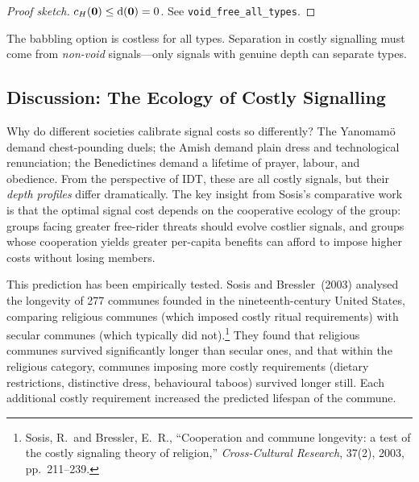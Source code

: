 \begin{proof}[Proof sketch]
$c_H(\mathbf{0}) \leq \operatorname{d}(\mathbf{0}) = 0$.
See \texttt{void\_free\_all\_types}.
\end{proof}

\begin{remark}
The babbling option is costless for all types.  Separation in costly
signalling must come from \emph{non-void} signals---only signals with
genuine depth can separate types.
\end{remark}

\subsection*{Discussion: The Ecology of Costly Signalling}

Why do different societies calibrate signal costs so differently?  The
Yanomam\"{o} demand chest-pounding duels; the Amish demand plain dress
and technological renunciation; the Benedictines demand a lifetime of
prayer, labour, and obedience.  From the perspective of IDT, these
are all costly signals, but their \emph{depth profiles} differ
dramatically.  The key insight from Sosis's comparative work is that
the optimal signal cost depends on the cooperative ecology of the
group: groups facing greater free-rider threats should evolve costlier
signals, and groups whose cooperation yields greater per-capita
benefits can afford to impose higher costs without losing members.

This prediction has been empirically tested.  Sosis and
Bressler~(2003) analysed the longevity of 277 communes founded in the
nineteenth-century United States, comparing religious communes (which
imposed costly ritual requirements) with secular communes (which
typically did not).\footnote{Sosis, R.\ and Bressler, E.~R.,
  ``Cooperation and commune longevity: a test of the costly signaling
  theory of religion,'' \textit{Cross-Cultural Research}, 37(2), 2003,
  pp.~211--239.}  They found that religious communes survived
significantly longer than secular ones, and that within the religious
category, communes imposing more costly requirements (dietary
restrictions, distinctive dress, behavioural taboos) survived longer
still.  Each additional costly requirement increased the predicted
lifespan of the commune.

